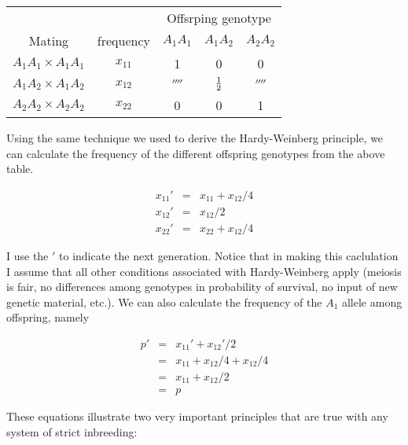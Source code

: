 \begin{center}
\begin{tabular}{ccccc}
\hline\hline
&&\multicolumn{3}{c}{Offsrping genotype} \\
Mating & frequency & $A_1A_1$ & $A_1A_2$ & $A_2A_2$ \\
\hline
$A_1A_1 \times A_1A_1$ & $x_{11}$ & 1 & 0 & 0 \\
$A_1A_2 \times A_1A_2$ & $x_{12}$ & $\fourth$ & $\frac{1}{2}$ & $\fourth$ \\
$A_2A_2 \times A_2A_2$ & $x_{22}$ & 0 & 0 & 1 \\
\hline
\end{tabular}
\end{center}

\noindent Using the same technique we used to derive the
Hardy-Weinberg principle, we can calculate the frequency of the
different offspring genotypes from the above table.

\begin{eqnarray}
x_{11}' &=& x_{11} + x_{12}/4 \\
x_{12}' &=& x_{12}/2 \\
x_{22}' &=& x_{22} + x_{12}/4
\end{eqnarray}

\noindent I use the $'$ to indicate the next generation. Notice that
in making this caclulation I assume that all other conditions
associated with Hardy-Weinberg apply (meiosis is fair, no differences
among genotypes in probability of survival, no input of new genetic
material, etc.). We can also calculate the frequency of the $A_1$
allele among offspring, namely

\begin{eqnarray}
p' &=& x_{11}' + x_{12}'/2 \\
   &=& x_{11} + x_{12}/4 + x_{12} /4 \\
   &=& x_{11} + x_{12}/2 \\
   &=& p
\end{eqnarray}

These equations illustrate two very important principles that are true
with any system of strict inbreeding:

